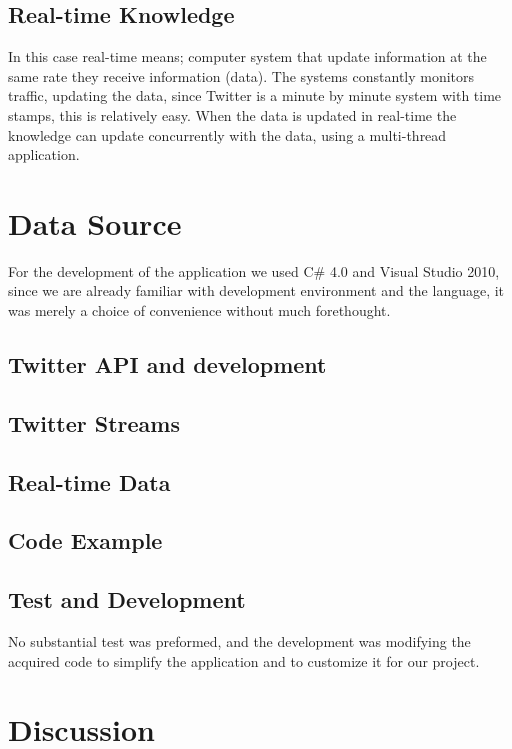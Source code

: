 \documentclass[]{article}  %
\begin{document}
\subsection{Real-time Knowledge}

In this case real-time means; computer system that update information at the same rate they receive information (data). The systems constantly monitors traffic, updating the data, since Twitter is a minute by minute system with time stamps, this is relatively  easy. When the data is updated in real-time the knowledge can update concurrently with the data, using a multi-thread application.

\section{Data Source}

For the development of the application we used C\# 4.0 and Visual Studio 2010, since we are already familiar with development environment and the language, it was merely a choice of convenience without much forethought.

\subsection{Twitter API and development}

\subsection{Twitter Streams}

\subsection{Real-time Data}

\subsection{Code Example}

\subsection{Test and Development}

No substantial test was preformed, and the development was modifying the acquired code to simplify the application and to customize it for our project. 


\section{Discussion}
\end{document}
